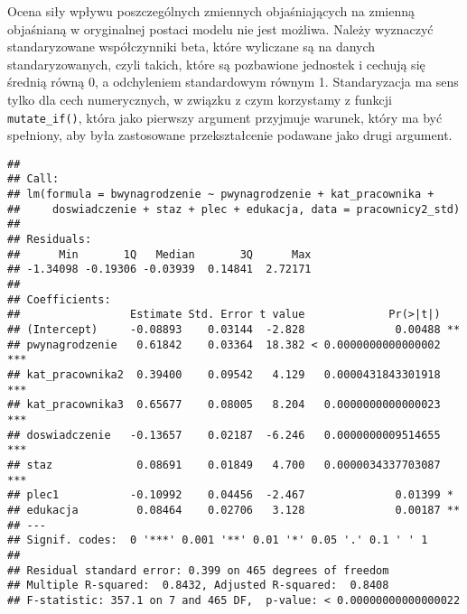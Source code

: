 \documentclass[]{book}
\newenvironment{Shaded}{\begin{snugshade}}{\end{snugshade}}
\newcommand{\KeywordTok}[1]{\textcolor[rgb]{0.13,0.29,0.53}{\textbf{#1}}}
\newcommand{\DataTypeTok}[1]{\textcolor[rgb]{0.13,0.29,0.53}{#1}}
\newcommand{\StringTok}[1]{\textcolor[rgb]{0.31,0.60,0.02}{#1}}
\newcommand{\OperatorTok}[1]{\textcolor[rgb]{0.81,0.36,0.00}{\textbf{#1}}}
\newcommand{\NormalTok}[1]{#1}
\begin{document}
Ocena siły wpływu poszczególnych zmiennych objaśniających na zmienną
objaśnianą w oryginalnej postaci modelu nie jest możliwa. Należy
wyznaczyć standaryzowane współczynniki beta, które wyliczane są na
danych standaryzowanych, czyli takich, które są pozbawione jednostek i
cechują się średnią równą 0, a odchyleniem standardowym równym 1.
Standaryzacja ma sens tylko dla cech numerycznych, w związku z czym
korzystamy z funkcji \texttt{mutate\_if()}, która jako pierwszy argument
przyjmuje warunek, który ma być spełniony, aby była zastosowane
przekształcenie podawane jako drugi argument.

\begin{Shaded}
\end{Shaded}

\begin{verbatim}
## 
## Call:
## lm(formula = bwynagrodzenie ~ pwynagrodzenie + kat_pracownika + 
##     doswiadczenie + staz + plec + edukacja, data = pracownicy2_std)
## 
## Residuals:
##      Min       1Q   Median       3Q      Max 
## -1.34098 -0.19306 -0.03939  0.14841  2.72171 
## 
## Coefficients:
##                 Estimate Std. Error t value             Pr(>|t|)    
## (Intercept)     -0.08893    0.03144  -2.828              0.00488 ** 
## pwynagrodzenie   0.61842    0.03364  18.382 < 0.0000000000000002 ***
## kat_pracownika2  0.39400    0.09542   4.129   0.0000431843301918 ***
## kat_pracownika3  0.65677    0.08005   8.204   0.0000000000000023 ***
## doswiadczenie   -0.13657    0.02187  -6.246   0.0000000009514655 ***
## staz             0.08691    0.01849   4.700   0.0000034337703087 ***
## plec1           -0.10992    0.04456  -2.467              0.01399 *  
## edukacja         0.08464    0.02706   3.128              0.00187 ** 
## ---
## Signif. codes:  0 '***' 0.001 '**' 0.01 '*' 0.05 '.' 0.1 ' ' 1
## 
## Residual standard error: 0.399 on 465 degrees of freedom
## Multiple R-squared:  0.8432, Adjusted R-squared:  0.8408 
## F-statistic: 357.1 on 7 and 465 DF,  p-value: < 0.00000000000000022
\end{verbatim}
\end{document}
